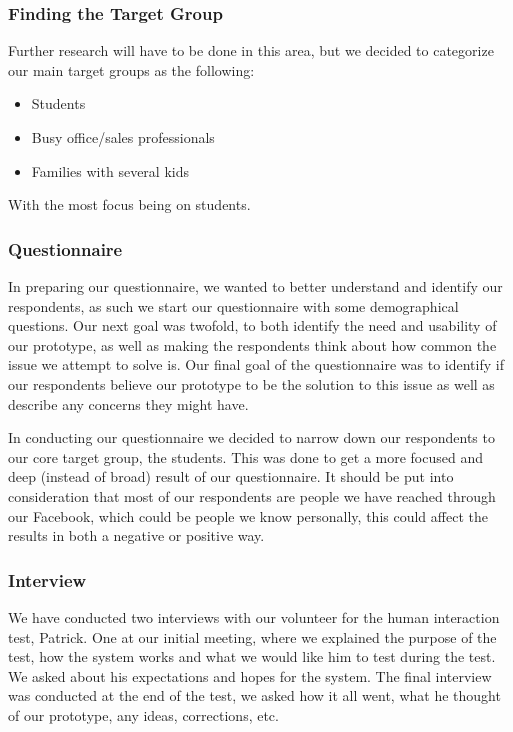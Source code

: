 \documentclass{ubicomp2012}
\begin{document}
\subsubsection{Finding the Target Group}
Further research will have to be done in this area, but we decided to categorize our main target groups as the following:
\begin{itemize}
  \item Students
  \item Busy office/sales professionals 
  \item Families with several kids
\end{itemize}
With the most focus being on students.

\subsubsection{Questionnaire}
In preparing our questionnaire, we wanted to better understand and identify our respondents, as such we start our questionnaire with some demographical questions. Our next goal was twofold, to both identify the need and usability of our prototype, as well as making the respondents think about how common the issue we attempt to solve is. Our final goal of the questionnaire was to identify if our respondents believe our prototype to be the solution to this issue as well as describe any concerns they might have.

In conducting our questionnaire we decided to narrow down our respondents to our core target group, the students. This was done to get a more focused and deep (instead of broad) result of our questionnaire.
It should be put into consideration that most of our respondents are people we have reached through our Facebook, which could be people we know personally, this could affect the results in both a negative or positive way.

\subsubsection{Interview}
We have conducted two interviews with our volunteer for the human interaction test, Patrick. One at our initial meeting, where we explained the purpose of the test, how the system works and what we would like him to test during the test. We asked about his expectations and hopes for the system.
The final interview was conducted at the end of the test, we asked how it all went, what he thought of our prototype, any ideas, corrections, etc.
\end{document}
